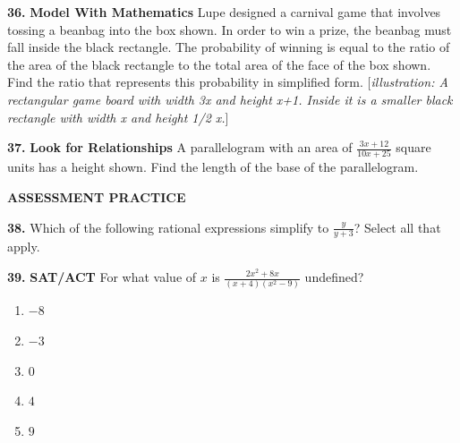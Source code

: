 \documentclass{article}
\newenvironment{practice}[2]{\textbf{#1.}}{\vspace{1em}}
\newcommand{\answer}[1]{}
\newcommand{\placeholder}[2]{[\textit{#1: #2}]}
\newcommand{\uncertain}[2]{#1}
\begin{document}
\begin{practice}{36}{\uncertain{?}{missing DOK}}
\textbf{Model With Mathematics} Lupe designed a carnival game that involves tossing a beanbag into the box shown. In order to win a prize, the beanbag must fall inside the black rectangle. The probability of winning is equal to the ratio of the area of the black rectangle to the total area of the face of the box shown. Find the ratio that represents this probability in simplified form.
\placeholder{illustration}{A rectangular game board with width 3x and height x+1. Inside it is a smaller black rectangle with width x and height 1/2 x.}
\answer{}
\end{practice}

\begin{practice}{37}{\uncertain{?}{missing DOK}}
\textbf{Look for Relationships} A parallelogram with an area of $\frac{3x+12}{10x+25}$ square units has a height shown. Find the length of the base of the parallelogram.

\answer{}
\end{practice}

\textbf{ASSESSMENT PRACTICE}

\begin{practice}{38}{\uncertain{?}{missing DOK}}
Which of the following rational expressions simplify to $\frac{y}{y+3}$? Select all that apply.
\begin{itemize}
    \item[$\square$] $\frac{(2y^2+y)(y+3)}{(4y+2)(y+3)^2}$
    \item[$\square$] $\frac{3y^2+y}{3y^2+10y+3}$
    \item[$\square$] $\frac{2y^3+3y^2+y}{(2y+1)(y^2+4y+3)$
    \item[$\square$] $\frac{y^2+2y}{y^2+4y+3}$
    \item[$\square$] $\frac{\frac{1}{y}}{y+3}$
\end{itemize}
\answer{}
\end{practice}

\begin{practice}{39}{\uncertain{?}{missing DOK}}
\textbf{SAT/ACT} For what value of $x$ is $\frac{2x^2+8x}{(x+4)(x^2-9)}$ undefined?
\begin{enumerate}
    \item[A] $-8$
    \item[B] $-3$
    \item[C] $0$
    \item[D] $4$
    \item[E] $9$
\end{enumerate}
\answer{}
\end{practice}
\end{document}
